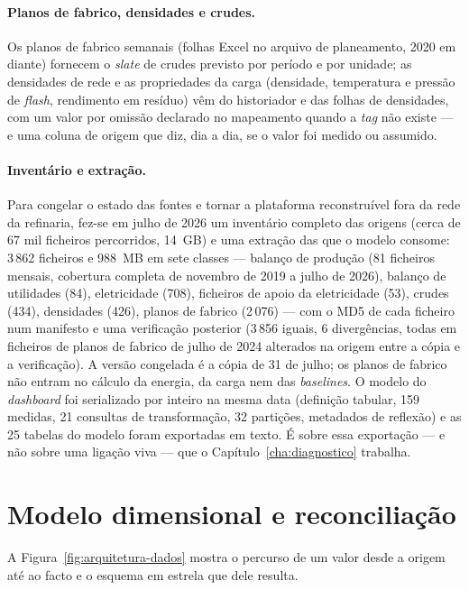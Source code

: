 \paragraph{Planos de fabrico, densidades e crudes.} Os planos de fabrico
semanais (folhas Excel no arquivo de planeamento, 2020 em diante)
fornecem o \emph{slate} de crudes previsto por período e por unidade; as
densidades de rede e as propriedades da carga (densidade, temperatura e
pressão de \emph{flash}, rendimento em resíduo) vêm do historiador e das
folhas de densidades, com um valor por omissão declarado no mapeamento
quando a \emph{tag} não existe --- e uma coluna de origem que diz, dia a
dia, se o valor foi medido ou assumido.

\paragraph{Inventário e extração.} Para congelar o estado das fontes e
tornar a plataforma reconstruível fora da rede da refinaria, fez-se em
julho de 2026 um inventário completo das origens (cerca de 67 mil ficheiros
percorridos, 14~GB) e uma extração das que o modelo consome: 3\,862
ficheiros e 988~MB em sete classes --- balanço de produção (81 ficheiros
mensais, cobertura completa de novembro de 2019 a julho de 2026), balanço
de utilidades (84), eletricidade (708), ficheiros de apoio da eletricidade
(53), crudes (434), densidades (426), planos de fabrico (2\,076) --- com o MD5 de cada ficheiro num manifesto e
uma verificação posterior (3\,856 iguais, 6 divergências, todas em
ficheiros de planos de fabrico de julho de 2024 alterados na origem entre a
cópia e a verificação). A versão congelada é a cópia de 31 de julho; os
planos de fabrico não entram no cálculo da energia, da carga nem das
\emph{baselines}.
O modelo do \emph{dashboard} foi serializado por inteiro na mesma data
(definição tabular, 159 medidas, 21 consultas de transformação, 32
partições, metadados de reflexão) e as 25 tabelas do modelo foram
exportadas em texto. É sobre essa exportação --- e não sobre uma ligação
viva --- que o Capítulo~\ref{cha:diagnostico} trabalha.

\section{Modelo dimensional e reconciliação}
\label{sec:modelo-dimensional}
A Figura~\ref{fig:arquitetura-dados} mostra o percurso de um valor desde a origem até ao facto e o esquema em estrela que dele resulta.

